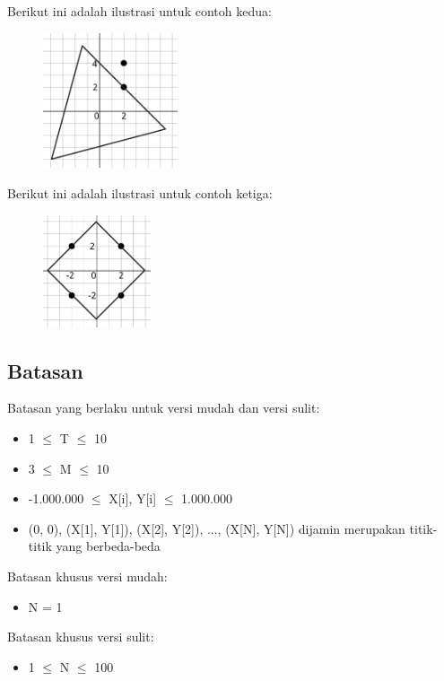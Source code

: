 \documentclass[../main_problemset.tex]{subfiles} %
\begin{document}
Berikut ini adalah ilustrasi untuk contoh kedua:

\begin{figure}[H]
	\centering
	\includegraphics[width=150px]{balon/asset/2}
\end{figure}

Berikut ini adalah ilustrasi untuk contoh ketiga:

\begin{figure}[H]
	\centering
	\includegraphics[width=120px]{balon/asset/3}
\end{figure}

\subsection*{Batasan}

\begin{minipage}[t]{0.47\textwidth}

Batasan yang berlaku untuk versi mudah dan versi sulit:

\begin{itemize}
	\item 1 $ \leq $ T $ \leq $ 10
	\item 3 $ \leq $ M $ \leq $ 10
	\item -1.000.000 $ \le $ X[i], Y[i] $ \le $ 1.000.000
	\item (0, 0), (X[1], Y[1]), (X[2], Y[2]), ..., (X[N], Y[N]) dijamin merupakan titik-titik yang berbeda-beda
\end{itemize}
\end{minipage}
\begin{minipage}[t]{0.06\textwidth}
	\hfill
\end{minipage}
\begin{minipage}[t]{0.47\textwidth}
Batasan khusus versi mudah:
\begin{itemize}
	\item N = 1
\end{itemize}

\vspace{.2cm}

Batasan khusus versi sulit:
\begin{itemize}
	\item 1 $ \le $ N $ \le $ 100
\end{itemize}
\end{minipage}
\end{document}
